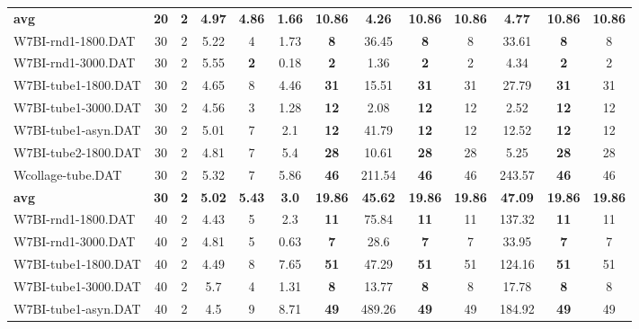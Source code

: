 \begin{table}[h]
{\begin{tabular}{lcccccccccccc}
\cline{1-13} \textbf{avg} & \textbf{20} & \textbf{2} & \textbf{4.97} & \textbf{4.86} & \textbf{1.66} & \textbf{10.86} & \textbf{4.26} & \textbf{10.86} & \textbf{10.86} & \textbf{4.77} & \textbf{10.86} & \textbf{10.86} \\ \cline{1-13}
W7BI-rnd1-1800.DAT & 30 & 2 & 5.22 & 4 &  \textcolor{blue2}{1.73} &  \textbf{8} & 36.45 &  \textbf{8} & 8 & 33.61 &  \textbf{8} & 8 \\
W7BI-rnd1-3000.DAT & 30 & 2 & 5.55 &  \textbf{2} &  \textcolor{blue2}{0.18} &  \textbf{2} & 1.36 &  \textbf{2} & 2 & 4.34 &  \textbf{2} & 2 \\
W7BI-tube1-1800.DAT & 30 & 2 & 4.65 & 8 &  \textcolor{blue2}{4.46} &  \textbf{31} & 15.51 &  \textbf{31} & 31 & 27.79 &  \textbf{31} & 31 \\
W7BI-tube1-3000.DAT & 30 & 2 & 4.56 & 3 &  \textcolor{blue2}{1.28} &  \textbf{12} & 2.08 &  \textbf{12} & 12 & 2.52 &  \textbf{12} & 12 \\
W7BI-tube1-asyn.DAT & 30 & 2 & 5.01 & 7 &  \textcolor{blue2}{2.1} &  \textbf{12} & 41.79 &  \textbf{12} & 12 & 12.52 &  \textbf{12} & 12 \\
W7BI-tube2-1800.DAT & 30 & 2 &  \textcolor{blue2}{4.81} & 7 & 5.4 &  \textbf{28} & 10.61 &  \textbf{28} & 28 & 5.25 &  \textbf{28} & 28 \\
Wcollage-tube.DAT & 30 & 2 &  \textcolor{blue2}{5.32} & 7 & 5.86 &  \textbf{46} & 211.54 &  \textbf{46} & 46 & 243.57 &  \textbf{46} & 46 \\
\cline{1-13} \textbf{avg} & \textbf{30} & \textbf{2} & \textbf{5.02} & \textbf{5.43} & \textbf{3.0} & \textbf{19.86} & \textbf{45.62} & \textbf{19.86} & \textbf{19.86} & \textbf{47.09} & \textbf{19.86} & \textbf{19.86} \\ \cline{1-13}
W7BI-rnd1-1800.DAT & 40 & 2 & 4.43 & 5 &  \textcolor{blue2}{2.3} &  \textbf{11} & 75.84 &  \textbf{11} & 11 & 137.32 &  \textbf{11} & 11 \\
W7BI-rnd1-3000.DAT & 40 & 2 & 4.81 & 5 &  \textcolor{blue2}{0.63} &  \textbf{7} & 28.6 &  \textbf{7} & 7 & 33.95 &  \textbf{7} & 7 \\
W7BI-tube1-1800.DAT & 40 & 2 &  \textcolor{blue2}{4.49} & 8 & 7.65 &  \textbf{51} & 47.29 &  \textbf{51} & 51 & 124.16 &  \textbf{51} & 51 \\
W7BI-tube1-3000.DAT & 40 & 2 & 5.7 & 4 &  \textcolor{blue2}{1.31} &  \textbf{8} & 13.77 &  \textbf{8} & 8 & 17.78 &  \textbf{8} & 8 \\
W7BI-tube1-asyn.DAT & 40 & 2 &  \textcolor{blue2}{4.5} & 9 & 8.71 &  \textbf{49} & 489.26 &  \textbf{49} & 49 & 184.92 &  \textbf{49} & 49 \\

\end{tabular}}
\end{table}
